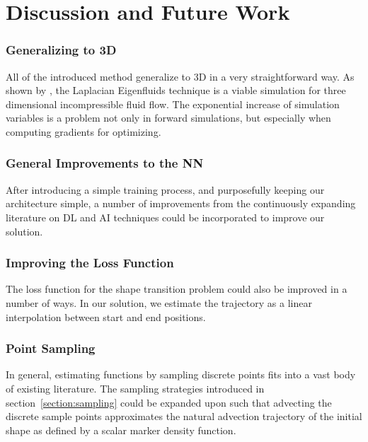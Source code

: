 \chapter{Discussion and Future Work}\label{chapter:discussion}


\subsection*{Generalizing to 3D}
All of the introduced method generalize to 3D in a very straightforward way. As
shown by \cite{scalable-eigenfluids}, the Laplacian Eigenfluids technique is
a viable simulation for three dimensional incompressible fluid flow. The
exponential increase of simulation variables is a problem not only in forward
simulations, but especially when computing gradients for optimizing. 

\subsection*{General Improvements to the NN}
After introducing a simple training process, and purposefully keeping our
architecture simple, a number of improvements from the continuously expanding
literature on \ac{DL} and \ac{AI} techniques could be incorporated to improve
our solution.

\subsection*{Improving the Loss Function}
The loss function for the shape transition problem could also be improved in
a number of ways. In our solution, we estimate the trajectory as a linear
interpolation between start and end positions. \

\subsection*{Point Sampling}
In general, estimating functions by sampling discrete points fits into a vast
body of existing literature. The sampling strategies introduced in
section~\ref{section:sampling} could be expanded upon such that advecting the
discrete sample points approximates the natural advection trajectory of the
initial shape as defined by a scalar marker density function.

